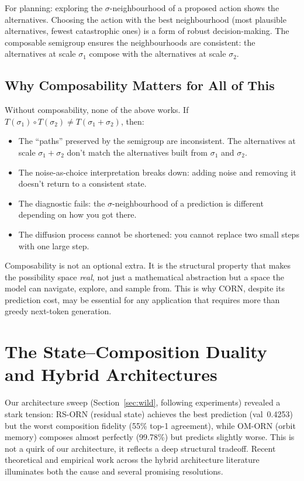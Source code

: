 \documentclass[11pt, a4paper]{article}
\theoremstyle{plain}
\theoremstyle{remark}
\begin{document}
For planning: exploring the $\sigma$-neighbourhood of a proposed action shows the alternatives.
Choosing the action with the best neighbourhood (most plausible alternatives, fewest catastrophic ones) is a form of robust decision-making.
The composable semigroup ensures the neighbourhoods are consistent: the alternatives at scale $\sigma_1$ compose with the alternatives at scale $\sigma_2$.

\subsection{Why Composability Matters for All of This}

Without composability, none of the above works.
If $T(\sigma_1) \circ T(\sigma_2) \neq T(\sigma_1{+}\sigma_2)$, then:
\begin{itemize}[nosep]
    \item The ``paths'' preserved by the semigroup are inconsistent.  The alternatives at scale $\sigma_1{+}\sigma_2$ don't match the alternatives built from $\sigma_1$ and $\sigma_2$.
    \item The noise-as-choice interpretation breaks down: adding noise and removing it doesn't return to a consistent state.
    \item The diagnostic fails: the $\sigma$-neighbourhood of a prediction is different depending on how you got there.
    \item The diffusion process cannot be shortened: you cannot replace two small steps with one large step.
\end{itemize}

Composability is not an optional extra.
It is the structural property that makes the possibility space \emph{real}, not just a mathematical abstraction but a space the model can navigate, explore, and sample from.
This is why CORN, despite its prediction cost, may be essential for any application that requires more than greedy next-token generation.

\section{The State--Composition Duality and Hybrid Architectures}\label{sec:state-composition}

Our architecture sweep (Section~\ref{sec:wild}, following experiments) revealed a stark tension: RS-ORN (residual state) achieves the best prediction (val~0.4253) but the worst composition fidelity (55\% top-1 agreement), while OM-ORN (orbit memory) composes almost perfectly (99.78\%) but predicts slightly worse.
This is not a quirk of our architecture, it reflects a deep structural tradeoff.
Recent theoretical and empirical work across the hybrid architecture literature illuminates both the cause and several promising resolutions.
\end{document}

